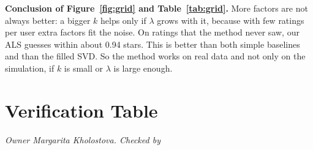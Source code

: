 \textbf{Conclusion of Figure~\ref{fig:grid} and Table~\ref{tab:grid}.} More factors are not always better: a bigger $k$ helps only if $\lambda$ grows with it, because with few ratings per user extra factors fit the noise. On ratings that the method never saw, our ALS guesses within about 0.94 stars. This is better than both simple baselines and than the filled SVD. So the method works on real data and not only on the simulation, if $k$ is small or $\lambda$ is large enough.

\section{Verification Table}
\textit{Owner Margarita Kholostova. Checked by \underline{\hspace{4cm}}}



